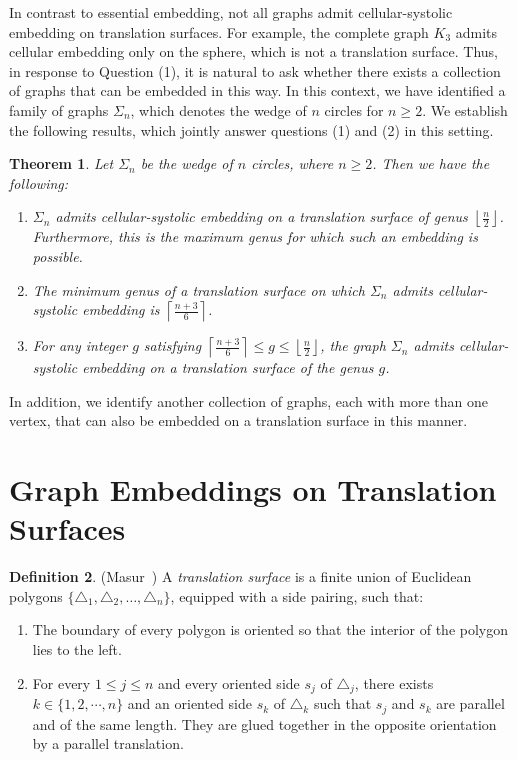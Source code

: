 \documentclass[11pt]{amsart}
\theoremstyle{plain}
\newtheorem{theorem}{Theorem}[section]
\theoremstyle{definition}
\newtheorem{definition}[theorem]{Definition}
\theoremstyle{remark}
\numberwithin{equation}{section}
\numberwithin{figure}{section}
\begin{document}
In contrast to essential embedding, not all graphs admit cellular-systolic embedding on translation surfaces. For example, the complete graph $K_3$ admits cellular embedding only on the sphere, which is not a translation surface. Thus, in response to Question (1), it is natural to ask whether there exists a collection of graphs that can be embedded in this way. In this context, we have identified a family of graphs $\Sigma_n$, which denotes the wedge of $n$ circles for $n \geq 2$. We establish the following results, which jointly answer questions (1) and (2) in this setting.

\begin{theorem} \label{cellular embedding}
Let $\Sigma_n$ be the wedge of $n$ circles, where $n \geq 2$. Then we have the following:
\begin{enumerate}
    \item $\Sigma_n$ admits cellular-systolic embedding on a translation surface of genus $\left\lfloor \frac{n}{2} \right\rfloor$. Furthermore, this is the maximum genus for which such an embedding is possible.
    
    \item The minimum genus of a translation surface on which $\Sigma_n$ admits cellular-systolic embedding is $\left\lceil \frac{n+3}{6} \right\rceil$.
    
    \item For any integer $g$ satisfying $\left\lceil \frac{n+3}{6} \right\rceil \leq g \leq \left\lfloor \frac{n}{2} \right\rfloor$, the graph $\Sigma_n$ admits  cellular-systolic embedding on a translation surface of the genus $g$.
\end{enumerate}
\end{theorem}


In addition, we identify another collection of graphs, each with more than one vertex, that can also be embedded on a translation surface in this manner.


\section{Graph Embeddings on Translation Surfaces}
\begin{definition}\label{Translation Surface} (Masur~\cite{Masur06})
A \emph{translation surface} is a finite union of Euclidean polygons $\{ \triangle_1, \triangle_2, \dots,\triangle_n \}$, equipped with a side pairing,
 such that:
\begin{enumerate}
    \item The boundary of every polygon is oriented so that the interior of the polygon lies to the left.
    \item For every $1\leq j\leq n$ and every oriented side $s_j$ of $\triangle_j$, there exists $k\in\{1,2,\cdots,n\}$ and an oriented side $s_k$ of $\triangle_k$ such that $s_j$ and $s_k$ are parallel and of the same length. They are glued together in the opposite orientation by a parallel translation.
\end{enumerate}
\end{definition}
\end{document}
